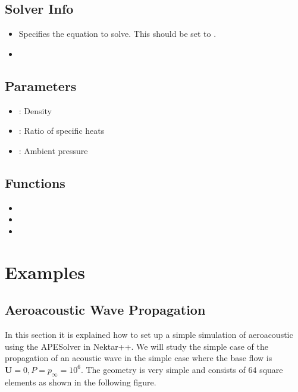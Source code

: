 \subsection{Solver Info}
\begin{itemize}
\item {} Specifies the equation to solve. This should be set to
.
\item {}
\end{itemize}

\subsection{Parameters}
\begin{itemize}
\item {}: Density
\item {}: Ratio of specific heats
\item {}: Ambient pressure
\end{itemize}

\subsection{Functions}
\begin{itemize}
\item {}
\item {}
\item {}
\end{itemize}


\section{Examples}
\subsection{Aeroacoustic Wave Propagation}

In this section it is explained how to set up a simple simulation of
aeroacoustic using the APESolver in Nektar++. We will study the simple case of
the propagation of an acoustic wave in the simple case where the base flow is
$\mathbf{U}=0, P=p_{\infty}=10^6$. The geometry is very simple and
consists of $64$ square elements as shown in the following figure.

